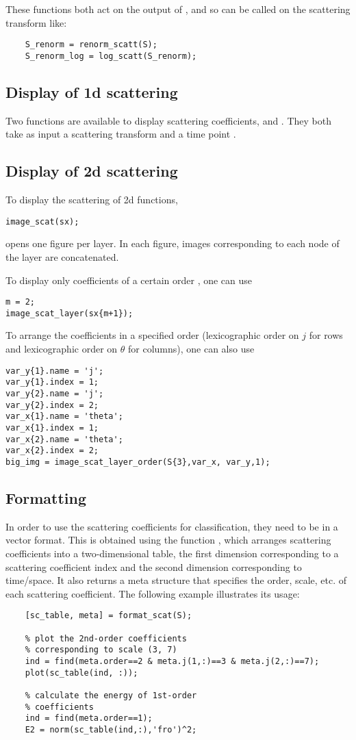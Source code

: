 \documentclass[twocolumn]{article}
\begin{document}
These functions both act on the output of , and so can be called on the scattering transform  like:
\begin{lstlisting}
	S_renorm = renorm_scatt(S);
	S_renorm_log = log_scatt(S_renorm);
\end{lstlisting}

\subsection{Display of 1d scattering}
Two functions are available to display scattering coefficients,  and . They both take as input a scattering transform  and a time point .

\subsection{Display of 2d scattering}
To display the scattering of 2d functions, 
\begin{lstlisting}
image_scat(sx);
\end{lstlisting}
opens one figure per layer. In each figure, images corresponding to each node of the layer are concatenated.

To display only coefficients of a certain order , one can use 
\begin{lstlisting}
m = 2;
image_scat_layer(sx{m+1});
\end{lstlisting}

To arrange the coefficients in a specified order (lexicographic order on $j$ for rows and lexicographic order on $\theta$ for columns), one can also use 
\begin{lstlisting}
var_y{1}.name = 'j';
var_y{1}.index = 1;
var_y{2}.name = 'j';
var_y{2}.index = 2;
var_x{1}.name = 'theta';
var_x{1}.index = 1;
var_x{2}.name = 'theta';
var_x{2}.index = 2;
big_img = image_scat_layer_order(S{3},var_x, var_y,1);
\end{lstlisting}


\subsection{Formatting}
In order to use the scattering coefficients for classification, they need to be in a vector format. This is obtained using the function , which arranges scattering coefficients into a two-dimensional table, the first dimension corresponding to a scattering coefficient index and the second dimension corresponding to time/space. It also returns a meta structure that specifies the order, scale, etc. of each scattering coefficient. The following example illustrates its usage:
\begin{lstlisting}
	[sc_table, meta] = format_scat(S);
	
	% plot the 2nd-order coefficients
	% corresponding to scale (3, 7)
	ind = find(meta.order==2 & meta.j(1,:)==3 & meta.j(2,:)==7);
	plot(sc_table(ind, :));
	
	% calculate the energy of 1st-order
	% coefficients
	ind = find(meta.order==1);
	E2 = norm(sc_table(ind,:),'fro')^2;
\end{lstlisting}
\end{document}
